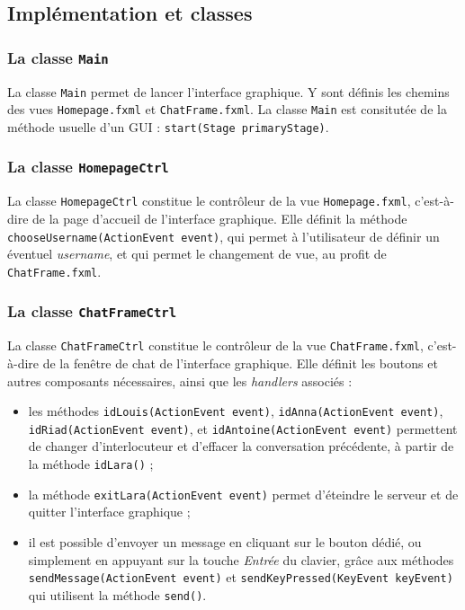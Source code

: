 \documentclass[10pt,a4paper]{article}
\begin{document}
\subsection{Implémentation et classes}
\subsubsection{La classe \texttt{Main}}

La classe \texttt{Main} permet de lancer l'interface graphique. Y sont définis les chemins des vues \texttt{Homepage.fxml} et \texttt{ChatFrame.fxml}. La classe \texttt{Main} est consitutée de la méthode usuelle d'un GUI : \texttt{start(Stage primaryStage)}.

\subsubsection{La classe \texttt{HomepageCtrl}}

La classe \texttt{HomepageCtrl} constitue le contrôleur de la vue \texttt{Homepage.fxml}, c'est-à-dire de la page d'accueil de l'interface graphique. Elle définit la méthode \texttt{chooseUsername(ActionEvent event)}, qui permet à l'utilisateur de définir un éventuel \textit{username}, et qui permet le changement de vue, au profit de \texttt{ChatFrame.fxml}.

\subsubsection{La classe \texttt{ChatFrameCtrl}}

La classe \texttt{ChatFrameCtrl} constitue le contrôleur de la vue \texttt{ChatFrame.fxml}, c'est-à-dire de la fenêtre de chat de l'interface graphique. Elle définit les boutons et autres composants nécessaires, ainsi que les \textit{handlers} associés :

\begin{itemize}
	\item les méthodes \texttt{idLouis(ActionEvent event)}, \texttt{idAnna(ActionEvent event)}, \texttt{idRiad(ActionEvent event)}, et \texttt{idAntoine(ActionEvent event)} permettent de changer d'interlocuteur et d'effacer la conversation précédente, à partir de la méthode \texttt{idLara()} ;
	\item la méthode \texttt{exitLara(ActionEvent event)} permet d'éteindre le serveur et de quitter l'interface graphique ;
	\item il est possible d'envoyer un message en cliquant sur le bouton dédié, ou simplement en appuyant sur la touche \textit{Entrée} du clavier, grâce aux méthodes \texttt{sendMessage(ActionEvent event)} et \texttt{sendKeyPressed(KeyEvent keyEvent)} qui utilisent la méthode \texttt{send()}.
\end{itemize}
\end{document}
